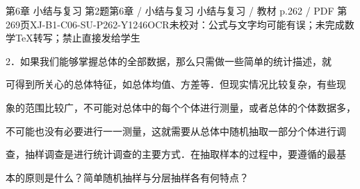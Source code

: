 \begin{bankitem}{第6章 小结与复习 第2题}{第6章 / 小结与复习 小结与复习 / 教材 p.262 / PDF 第269页}{XJ-B1-C06-SU-P262-Y1246}{OCR未校对：公式与文字均可能有误；未完成数学TeX转写；禁止直接发给学生}
\begin{ocrdraft}
\par
2．如果我们能够掌握总体的全部数据，那么只需做一些简单的统计描述，就
\par
可得到所关心的总体特征，如总体均值、方差等．但现实情况比较复杂，有些现
\par
象的范围比较广，不可能对总体中的每个个体进行测量，或者总体的个体数据多，
\par
不可能也没有必要进行一一测量，这就需要从总体中随机抽取一部分个体进行调
\par
查，抽样调查是进行统计调查的主要方式．在抽取样本的过程中，要遵循的最基
\par
本的原则是什么？简单随机抽样与分层抽样各有何特点？
\end{ocrdraft}
\end{bankitem}
